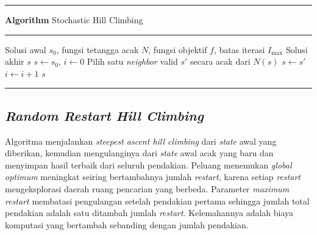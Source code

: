 \begingroup
\setlength{\parskip}{0pt}
\begin{list}{}{\setlength{\leftmargin}{0.1\linewidth}\setlength{\rightmargin}{0.1\linewidth}\setlength{\labelsep}{0pt}\setlength{\topsep}{0pt}\setlength{\partopsep}{0pt}\setlength{\parsep}{0pt}\setlength{\itemsep}{0pt}}\item[]
\noindent\rule{\linewidth}{0.8pt}\par\vspace{1pt}
\noindent{}\textbf{Algorithm \thealgorithm} Stochastic Hill Climbing\label{alg:stochastic-hill-climbing}\par
\vspace{1pt}\noindent\rule{\linewidth}{0.4pt}\par\vspace{1pt}
\begin{algorithmic}
    \REQUIRE Solusi awal $s_0$, fungsi tetangga acak $N$, fungsi objektif $f$, batas iterasi $I_{\max}$
    \ENSURE Solusi akhir $s$
    \STATE $s \gets s_0$, $i \gets 0$
    \STATE Pilih satu \textit{neighbor} valid $s'$ secara acak dari $N(s)$
    \STATE $s \gets s'$
    \ENDIF
    \STATE $i \gets i+1$
    \ENDWHILE
    \RETURN $s$
\end{algorithmic}
\par\vspace{1pt}\noindent\rule{\linewidth}{0.8pt}
\end{list}
\endgroup

\subsection{\textit{Random Restart Hill Climbing}}
Algoritma menjalankan \textit{steepest ascent hill climbing} dari \textit{state} awal yang diberikan, kemudian mengulanginya dari \textit{state} awal acak yang baru dan menyimpan hasil terbaik dari seluruh pendakian. Peluang menemukan \textit{global optimum} meningkat seiring bertambahnya jumlah \textit{restart}, karena setiap \textit{restart} mengeksplorasi daerah ruang pencarian yang berbeda. Parameter \textit{maximum restart} membatasi pengulangan setelah pendakian pertama sehingga jumlah total pendakian adalah satu ditambah jumlah \textit{restart}. Kelemahannya adalah biaya komputasi yang bertambah sebanding dengan jumlah pendakian.

